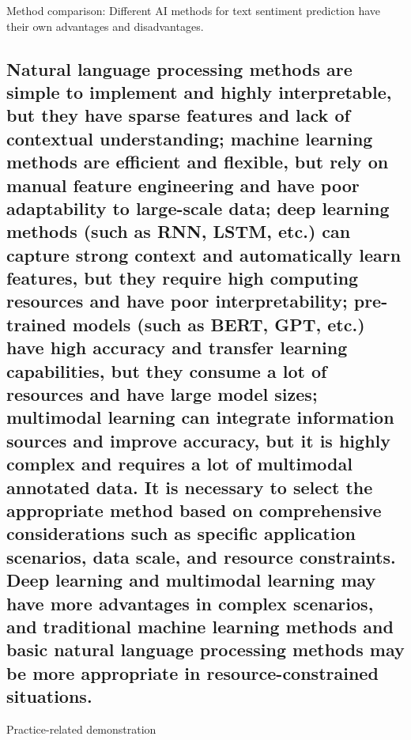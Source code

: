 \documentclass[journal]{IEEEtran}
\begin{document}
Method comparison: Different AI methods for text sentiment prediction have their own advantages and disadvantages.

\subsection{Natural language processing methods are simple to implement and highly interpretable, but they have sparse features and lack of contextual understanding; machine learning methods are efficient and flexible, but rely on manual feature engineering and have poor adaptability to large-scale data; deep learning methods (such as RNN, LSTM, etc.) can capture strong context and automatically learn features, but they require high computing resources and have poor interpretability; pre-trained models (such as BERT, GPT, etc.) have high accuracy and transfer learning capabilities, but they consume a lot of resources and have large model sizes; multimodal learning can integrate information sources and improve accuracy, but it is highly complex and requires a lot of multimodal annotated data. It is necessary to select the appropriate method based on comprehensive considerations such as specific application scenarios, data scale, and resource constraints. Deep learning and multimodal learning may have more advantages in complex scenarios, and traditional machine learning methods and basic natural language processing methods may be more appropriate in resource-constrained situations.}

Practice-related demonstration
\end{document}
